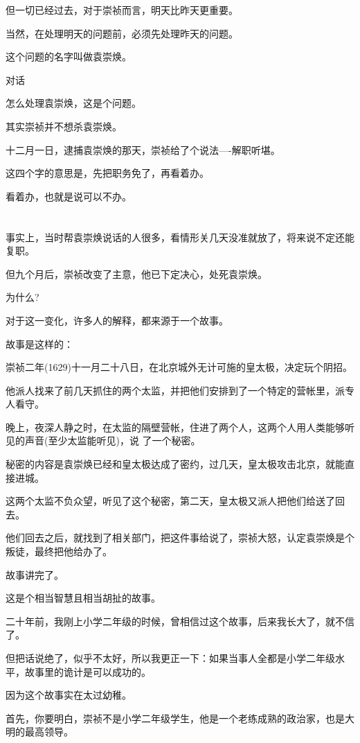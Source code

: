\documentclass[11pt,a4paper,onecolumn]{article}
\begin{document}
但一切已经过去，对于崇祯而言，明天比昨天更重要。

当然，在处理明天的问题前，必须先处理昨天的问题。

这个问题的名字叫做袁崇焕。

对话

怎么处理袁崇焕，这是个问题。

其实崇祯并不想杀袁崇焕。

十二月一日，逮捕袁崇焕的那天，崇祯给了个说法----解职听堪。

这四个字的意思是，先把职务免了，再看着办。

看着办，也就是说可以不办。

\section[\thesection]{}

事实上，当时帮袁崇焕说话的人很多，看情形关几天没准就放了，将来说不定还能复职。

但九个月后，崇祯改变了主意，他已下定决心，处死袁崇焕。

为什么?

对于这一变化，许多人的解释，都来源于一个故事。

故事是这样的：

崇祯二年(1629)十一月二十八日，在北京城外无计可施的皇太极，决定玩个阴招。

他派人找来了前几天抓住的两个太监，并把他们安排到了一个特定的营帐里，派专人看守。

晚上，夜深人静之时，在太监的隔壁营帐，住进了两个人，这两个人用人类能够听见的声音(至少太监能听见)，说
了一个秘密。

秘密的内容是袁崇焕已经和皇太极达成了密约，过几天，皇太极攻击北京，就能直接进城。

这两个太监不负众望，听见了这个秘密，第二天，皇太极又派人把他们给送了回去。

他们回去之后，就找到了相关部门，把这件事给说了，崇祯大怒，认定袁崇焕是个叛徒，最终把他给办了。

故事讲完了。

这是个相当智慧且相当胡扯的故事。

二十年前，我刚上小学二年级的时候，曾相信过这个故事，后来我长大了，就不信了。

但把话说绝了，似乎不太好，所以我更正一下：如果当事人全都是小学二年级水平，故事里的诡计是可以成功的。

因为这个故事实在太过幼稚。

首先，你要明白，崇祯不是小学二年级学生，他是一个老练成熟的政治家，也是大明的最高领导。
\end{document}
